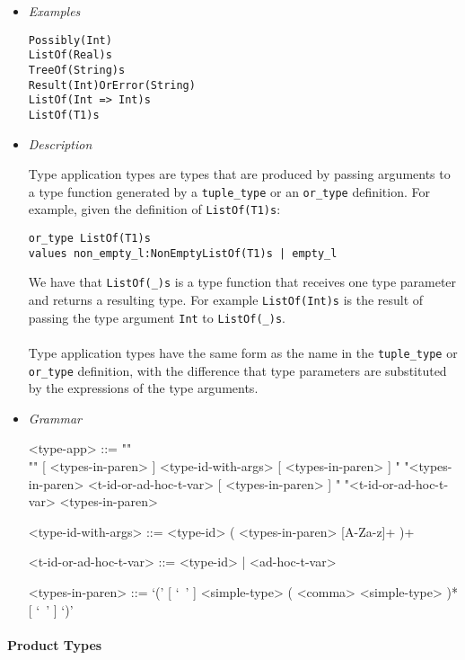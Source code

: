 \documentclass{article}
\begin{document}
\begin{itemize}
\item \textit{Examples}
\begin{verbatim}
Possibly(Int)
ListOf(Real)s
TreeOf(String)s 
Result(Int)OrError(String)
ListOf(Int => Int)s
ListOf(T1)s
\end{verbatim}

\item \textit{Description}

Type application types are types that are produced by passing arguments
to a type function generated by a \verb|tuple_type| or an \verb|or_type|
definition. For example, given the definition of \verb|ListOf(T1)s|:
\begin{verbatim}
or_type ListOf(T1)s
values non_empty_l:NonEmptyListOf(T1)s | empty_l
\end{verbatim}
We have that \verb|ListOf(_)s| is a type function that receives one type
parameter and returns a resulting type. For example \verb|ListOf(Int)s| is
the result of passing the type argument \verb|Int| to \verb|ListOf(_)s|.
\\\\
Type application types have the same form as the name in the
\verb|tuple_type| or \verb|or_type| definition, with the difference that
type parameters are substituted by the expressions of the type arguments.

\item \textit{Grammar}
\begin{grammar}
<type-app> ::= ""\\""
[ <types-in-paren> ] <type-id-with-args> [ <types-in-paren> ]
\alt " "<types-in-paren> <t-id-or-ad-hoc-t-var> [ <types-in-paren> ]
\alt " "<t-id-or-ad-hoc-t-var> <types-in-paren>

<type-id-with-args> ::= <type-id> ( <types-in-paren> [A-Za-z]+ )+

<t-id-or-ad-hoc-t-var> ::= <type-id> | <ad-hoc-t-var>

<types-in-paren> ::=
`(' [ `\ ' ] <simple-type> ( <comma> <simple-type> )* [ `\ ' ] `)'
\end{grammar}
\end{itemize}

\newpage

\paragraph{Product Types}
\end{document}
